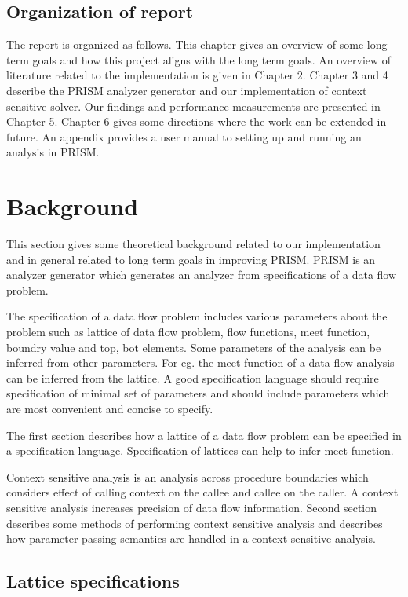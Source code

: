 \documentclass[12pt]{report}
\begin{document}
\section{Organization of report}

The report is organized as follows. This chapter gives an overview of some long term goals and how this project aligns with the long term goals. An overview of literature related to the implementation is given in Chapter 2. Chapter 3 and 4 describe the PRISM analyzer generator and our implementation of context sensitive solver. Our findings and performance measurements are presented in Chapter 5. Chapter 6 gives some directions where the work can be extended in future. An appendix provides a user manual to setting up and running an analysis in PRISM.

\newpage
\chapter{Background}

This section gives some theoretical background related to our implementation and in general related to long term goals in improving PRISM. PRISM is an analyzer generator which generates an analyzer from specifications of a data flow problem. 

The specification of a data flow problem includes various parameters about the problem such as lattice of data flow problem, flow functions, meet function, boundry value and top, bot elements. Some parameters of the analysis can be inferred from other parameters. For eg. the meet function of a data flow analysis can be inferred from the lattice. A good specification language should require specification of minimal set of parameters and should include parameters which are most convenient and concise to specify.

The first section describes how a lattice of a data flow problem can be specified in a specification language. Specification of lattices can help to infer meet function. 

Context sensitive analysis is an analysis across procedure boundaries which considers effect of calling context on the callee and callee on the caller. A context sensitive analysis increases precision of data flow information. Second section describes some methods of performing context sensitive analysis and describes how parameter passing semantics are handled in a context sensitive analysis. 

 
\section{Lattice specifications}
\end{document}

